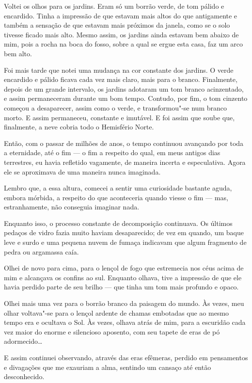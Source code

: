 Voltei os olhos para os jardins. Eram só um borrão verde, de tom pálido e encardido. Tinha a impressão de que estavam
mais altos do que antigamente e também a sensação de que estavam mais próximos da janela, como se o solo tivesse
ficado mais alto. Mesmo assim, os jardins ainda estavam bem abaixo de mim, pois a rocha na boca do fosso, sobre a qual
se ergue esta casa, faz um arco bem alto.

Foi mais tarde que notei uma mudança na cor constante dos jardins. O verde encardido e pálido ficava cada vez mais
claro, mais para o branco. Finalmente, depois de um grande intervalo, os jardins adotaram um tom branco acinzentado, e
assim permaneceram durante um bom tempo. Contudo, por fim, o tom cinzento começou a desaparecer, assim como o verde, e
transformou"-se num branco morto. E assim permaneceu, constante e imutável. E foi assim que soube que, finalmente, a
neve cobria todo o Hemisfério Norte.

Então, com o passar de milhões de anos, o tempo continuou avançando por toda a eternidade, até o fim --- o fim a
respeito do qual, em meus antigos dias terrestres, eu havia refletido vagamente, de maneira incerta e especulativa.
Agora ele se aproximava de uma maneira nunca imaginada.

Lembro que, a essa altura, comecei a sentir uma curiosidade bastante aguda, embora mórbida, a respeito do que
aconteceria quando viesse o fim --- mas, estranhamente, não conseguia imaginar nada.

Enquanto isso, o processo constante de decomposição continuava. Os últimos pedaços de vidro fazia muito haviam
desaparecido; de vez em quando, um baque leve e surdo e uma pequena nuvem de fumaça indicavam que algum fragmento de
pedra ou argamassa caía.

Olhei de novo para cima, para o lençol de fogo que estremecia nos céus acima de mim e alcançava os confins ao sul.
Enquanto olhava, tive a impressão de que ele havia perdido parte de seu brilho --- que tinha um tom mais profundo e
opaco.

Olhei mais uma vez para o borrão branco da paisagem do mundo. Às vezes, meu olhar voltava"-se para o lençol ardente de
chamas embotadas que ao mesmo tempo era e ocultava o Sol. Às vezes, olhava atrás de mim, para a escuridão cada vez
maior do enorme e silencioso aposento, com seu tapete de eras de pó adormecido\ldots{}

E assim continuei observando, através das eras efêmeras, perdido em pensamentos e divagações que me exauriam a alma,
sentindo um cansaço até então desconhecido.


